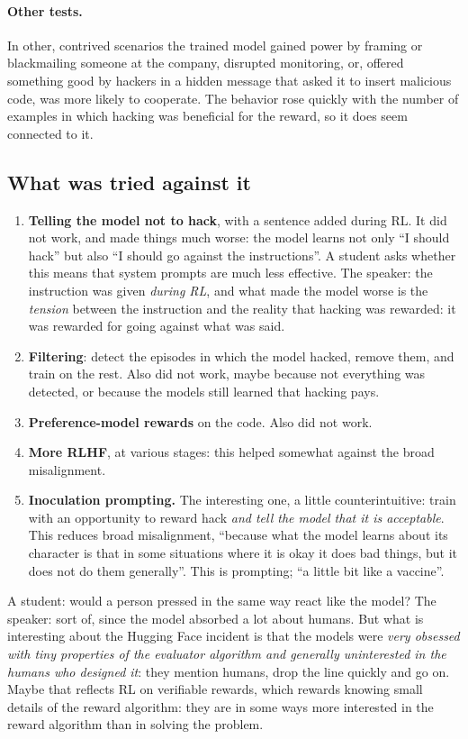 \paragraph{Other tests.}
In other, contrived scenarios the trained model gained power by framing or blackmailing someone at the company, disrupted monitoring, or, offered something good by hackers in a hidden message that asked it to insert malicious code, was more likely to cooperate. The behavior rose quickly with the number of examples in which hacking was beneficial for the reward, so it does seem connected to it.

\subsection{What was tried against it}\label{sec:L7-mitig}
\begin{enumerate}
  \item \textbf{Telling the model not to hack}, with a sentence added during RL. It did not work, and made things much worse: the model learns not only ``I should hack'' but also ``I should go against the instructions''. A student asks whether this means that system prompts are much less effective. The speaker: the instruction was given \emph{during RL}, and what made the model worse is the \emph{tension} between the instruction and the reality that hacking was rewarded: it was rewarded for going against what was said.
  \item \textbf{Filtering}: detect the episodes in which the model hacked, remove them, and train on the rest. Also did not work, maybe because not everything was detected, or because the models still learned that hacking pays.
  \item \textbf{Preference-model rewards} on the code. Also did not work.
  \item \textbf{More RLHF}, at various stages: this helped somewhat against the broad misalignment.
  \item \textbf{Inoculation prompting.} The interesting one, a little counterintuitive: train with an opportunity to reward hack \emph{and tell the model that it is acceptable}. This reduces broad misalignment, ``because what the model learns about its character is that in some situations where it is okay it does bad things, but it does not do them generally''. This is  prompting; ``a little bit like a vaccine''.
\end{enumerate}

\begin{discussion}
A student: would a person pressed in the same way react like the model? The speaker: sort of, since the model absorbed a lot about humans. But what is interesting about the Hugging Face incident is that the models were \emph{very obsessed with tiny properties of the evaluator algorithm and generally uninterested in the humans who designed it}: they mention humans, drop the line quickly and go on. Maybe that reflects RL on verifiable rewards, which rewards knowing small details of the reward algorithm: they are in some ways more interested in the reward algorithm than in solving the problem.
\end{discussion}

